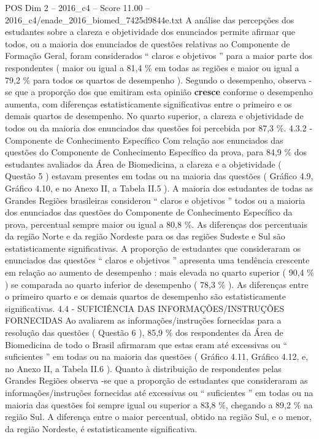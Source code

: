 \begin{textsample}{POS Dim 2 – 2016\_c4 – Score 11.00 – 2016\_c4/enade\_2016\_biomed\_7425d9844e.txt}
A análise das percepções dos estudantes sobre a clareza e objetividade dos enunciados permite afirmar que todos, ou a maioria dos enunciados de questões relativas ao Componente de Formação Geral, foram considerados “ claros e objetivos ” para a maior parte dos respondentes ( maior ou igual a 81,4 \% em todas as regiões e maior ou igual a 79,2 \% para todos os quartos de desempenho ).
Segundo o desempenho, observa -se que a proporção dos que emitiram esta opinião \textbf{cresce} conforme o desempenho aumenta, com diferenças estatisticamente significativas entre o primeiro e os demais quartos de desempenho.
No quarto superior, a clareza e objetividade de todos ou da maioria dos enunciados das questões foi percebida por 87,3 \%. 4.3.2 - Componente de Conhecimento Específico Com relação aos enunciados das questões do Componente de Conhecimento Específico da prova, para 84,9 \% dos estudantes avaliados da Área de Biomedicina, a clareza e a objetividade ( Questão 5 ) estavam presentes em todas ou na maioria das questões ( Gráfico 4.9, Gráfico 4.10, e no Anexo II, a Tabela II.5 ).
A maioria dos estudantes de todas as Grandes Regiões brasileiras considerou “ claros e objetivos ” todos ou a maioria dos enunciados das questões do Componente de Conhecimento Específico da prova, percentual sempre maior ou igual a 80,8 \%.
As diferenças dos percentuais da região Norte e da região Nordeste para os das regiões Sudeste e Sul são estatisticamente significativas.
A proporção de estudantes que consideraram os enunciados das questões “ claros e objetivos ” apresenta uma tendência crescente em relação ao aumento de desempenho : mais elevada no quarto superior ( 90,4 \% ) se comparada ao quarto inferior de desempenho ( 78,3 \% ).
As diferenças entre o primeiro quarto e os demais quartos de desempenho são estatisticamente significativas. 4.4 - SUFICIÊNCIA DAS INFORMAÇÕES/INSTRUÇÕES FORNECIDAS Ao avaliarem as informações/instruções fornecidas para a resolução das questões ( Questão 6 ), 85,9 \% dos respondentes da Área de Biomedicina de todo o Brasil afirmaram que estas eram até excessivas ou “ suficientes ” em todas ou na maioria das questões ( Gráfico 4.11, Gráfico 4.12, e, no Anexo II, a Tabela II.6 ).
Quanto à distribuição de respondentes pelas Grandes Regiões observa -se que a proporção de estudantes que consideraram as informações/instruções fornecidas até excessivas ou “ suficientes ” em todas ou na maioria das questões foi sempre igual ou superior a 83,8 \%, chegando a 89,2 \% na região Sul.
A diferença entre o maior percentual, obtido na região Sul, e o menor, da região Nordeste, é estatisticamente significativa.

\end{textsample}
